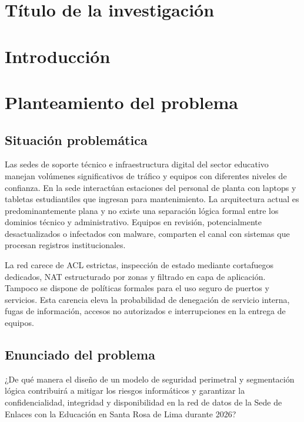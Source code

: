 \documentclass[11pt,letterpaper]{article}
\begin{document}
\portadareporte
{}
\tableofcontents
\clearpage
{}

\section{Título de la investigación}
\TituloTrabajo

\section{Introducción}

\section{Planteamiento del problema}
\subsection{Situación problemática}
Las sedes de soporte técnico e infraestructura digital del sector educativo
manejan volúmenes significativos de tráfico y equipos con diferentes niveles de
confianza. En la sede interactúan estaciones del personal de planta con laptops
y tabletas estudiantiles que ingresan para mantenimiento. La arquitectura actual
es predominantemente plana y no existe una separación lógica formal entre los
dominios técnico y administrativo. Equipos en revisión, potencialmente
desactualizados o infectados con malware, comparten el canal con sistemas que
procesan registros institucionales.

La red carece de ACL estrictas, inspección de estado mediante cortafuegos
dedicados, NAT estructurado por zonas y filtrado en capa de aplicación. Tampoco
se dispone de políticas formales para el uso seguro de puertos y servicios. Esta
carencia eleva la probabilidad de denegación de servicio interna, fugas de
información, accesos no autorizados e interrupciones en la entrega de equipos.

\subsection{Enunciado del problema}
¿De qué manera el diseño de un modelo de seguridad perimetral y segmentación
lógica contribuirá a mitigar los riesgos informáticos y garantizar la
confidencialidad, integridad y disponibilidad en la red de datos de la Sede de
Enlaces con la Educación en Santa Rosa de Lima durante 2026?
\end{document}
